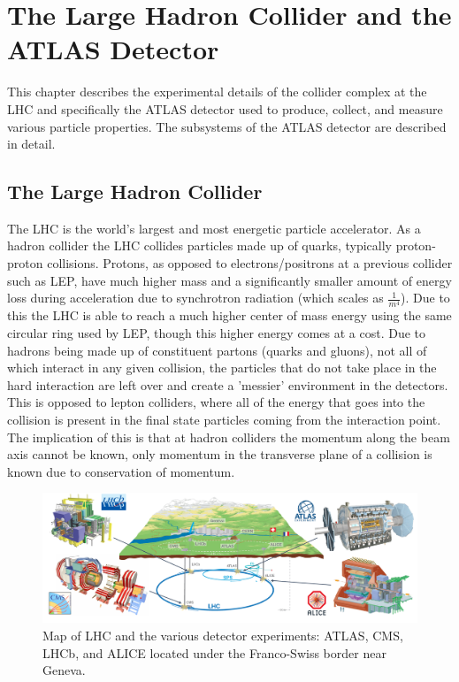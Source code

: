 
\chapter{The Large Hadron Collider and the ATLAS Detector}
\label{ch:LHCDetector}

This chapter describes the experimental details of the collider complex at the LHC and specifically the ATLAS detector used to produce, collect, and measure various particle properties.  The subsystems of the ATLAS detector are described in detail.
\section{The Large Hadron Collider}
\label{Section:LHC}
The LHC is the world's largest and most energetic particle accelerator.  As a hadron collider the LHC collides particles made up of quarks, typically proton-proton collisions.  Protons, as opposed to electrons/positrons at a previous collider such as LEP, have much higher mass and a significantly smaller amount of energy loss during acceleration due to synchrotron radiation (which scales as $\frac{1}{m^4}$).  Due to this the LHC is able to reach a much higher center of mass energy using the same circular ring used by LEP, though this higher energy comes at a cost.  Due to hadrons being made up of constituent partons (quarks and gluons), not all of which interact in any given collision, the particles that do not take place in the hard interaction are left over and create a 'messier' environment in the detectors.  This is opposed to lepton colliders, where all of the energy that goes into the collision is present in the final state particles coming from the interaction point.  The implication of this is that at hadron colliders the momentum along the beam axis cannot be known, only momentum in the transverse plane of a collision is known due to conservation of momentum.

\begin{figure}[ht!]
	\centering
	\includegraphics[width=\columnwidth]{../ThesisImages/LHCImages/LHCDetecPlacement.png}
	\caption[Map of LHC and the various detector experiments: ATLAS, CMS, LHCb, and ALICE located under the Franco-Swiss border near Geneva.]{Map of LHC and the various detector experiments: ATLAS, CMS, LHCb, and ALICE  located under the Franco-Swiss border near Geneva\cite{ATLASCoords}.}
	\label{fig:LHCDetPlace}
\end{figure}

